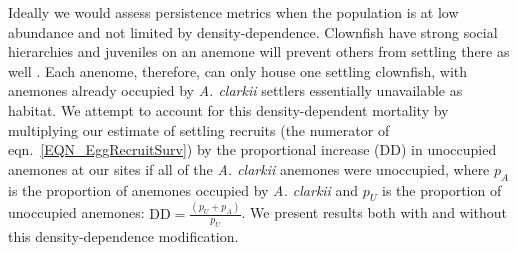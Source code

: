 \documentclass[12pt, oneside]{article}   	%
\begin{document}
Ideally we would assess persistence metrics when the population is at low abundance and not limited by density-dependence. Clownfish have strong social hierarchies and juveniles on an anemone will prevent others from settling there as well \citep[seen in \textit{A. percula,}][]{buston2003forcible}. Each anenome, therefore, can only house one settling clownfish, with anemones already occupied by \textit{A. clarkii} settlers essentially unavailable as habitat. We attempt to account for this density-dependent mortality by multiplying our estimate of settling recruits (the numerator of eqn.\ \ref{EQN_EggRecruitSurv}) by the proportional increase ($\text{DD}$) in unoccupied anemones at our sites if all of the \textit{A. clarkii} anemones were unoccupied, where $p_A$ is the proportion of anemones occupied by \textit{A. clarkii} and $p_U$ is the proportion of unoccupied anemones: $\text{DD} = \frac{(p_U + p_A)}{p_U}$. We present results both with and without this density-dependence modification.



\end{document}
